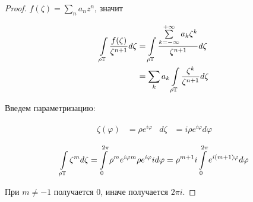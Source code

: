\begin{proof} \quad 

    $f(\zeta) = \sum\limits_n a_nz^n$, значит

    \begin{align*} 
        \int\limits_{\rho\mathbb{T}} \frac{f(\zeta)}{\zeta^{n+1}} d\zeta 
        &= \int\limits_{\rho\mathbb{T}} \frac{\sum\limits_{k=-\infty}^{+\infty} a_k \zeta^k}{\zeta^{n+1}} d\zeta \\ 
        &= \sum\limits_k a_k \int\limits_{\rho\mathbb{T}} \frac{\zeta^k}{\zeta^{n+1}} d\zeta
    \end{align*}

    Введем параметризацию: 

    \begin{align*}
        \zeta(\varphi) &= \rho e^{i\varphi} & d \zeta & = i  \rho e^{i\varphi} d \varphi
    \end{align*}
    \quad \;  
    
    \begin{gather*}
        \int\limits_{\rho\mathbb{T}} \zeta^m d\zeta = \int\limits_0^{2\pi}
        \rho^m e^{i\varphi m}\rho e^{i\varphi} i d\varphi
        = \rho^{m+1} i \int\limits_0^{2\pi } e^{i(m+1)\varphi} d\varphi
    \end{gather*}

    При $m \ne -1$ получается $0$, иначе получается $2\pi i$.
\end{proof}

\newpage